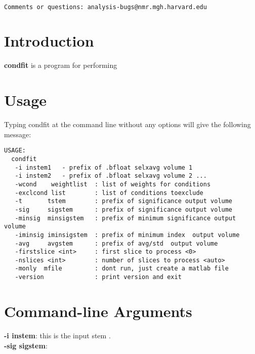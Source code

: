 \documentclass[10pt]{article}
\begin{document}
\begin{Large}
 \\
\end{Large}

\noindent 
\begin{verbatim}
Comments or questions: analysis-bugs@nmr.mgh.harvard.edu
\end{verbatim}

\section{Introduction}
{\bf condfit} is a program for performing 


\section{Usage}
Typing condfit at the command line without any options will give the
following message:\\ 

\begin{small}
\begin{verbatim}
USAGE:
  condfit
   -i instem1   - prefix of .bfloat selxavg volume 1
   -i instem2   - prefix of .bfloat selxavg volume 2 ...
   -wcond    weightlist  : list of weights for conditions
   -exclcond list        : list of conditions toexclude
   -t       tstem        : prefix of significance output volume
   -sig     sigstem      : prefix of significance output volume
   -minsig  minsigstem   : prefix of minimum significance output volume
   -iminsig iminsigstem  : prefix of minimum index  output volume
   -avg     avgstem      : prefix of avg/std  output volume
   -firstslice <int>     : first slice to process <0>
   -nslices <int>        : number of slices to process <auto>
   -monly  mfile         : dont run, just create a matlab file
   -version              : print version and exit
\end{verbatim}
\end{small}

\section{Command-line Arguments}

\noindent
{\bf -i instem}: this is the input stem .\\

\noindent
{\bf -sig sigstem}: 
\end{document}
